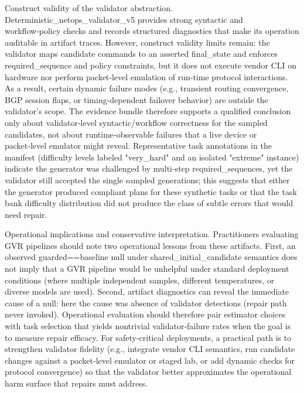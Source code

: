 \documentclass[conference]{IEEEtran}
\begin{document}
Construct validity of the validator abstraction. Deterministic\_netops\_validator\_v5 provides strong syntactic and workflow‑policy checks and records structured diagnostics that make its operation auditable in artifact traces. However, construct validity limits remain: the validator maps candidate commands to an asserted final\_state and enforces required\_sequence and policy constraints, but it does not execute vendor CLI on hardware nor perform packet‑level emulation of run‑time protocol interactions. As a result, certain dynamic failure modes (e.g., transient routing convergence, BGP session flaps, or timing-dependent failover behavior) are outside the validator's scope. The evidence bundle therefore supports a qualified conclusion only about validator‑level syntactic/workflow correctness for the sampled candidates, not about runtime‑observable failures that a live device or packet‑level emulator might reveal. Representative task annotations in the manifest (difficulty levels labeled "very\_hard" and an isolated "extreme" instance) indicate the generator was challenged by multi‑step required\_sequences, yet the validator still accepted the single sampled generations; this suggests that either the generator produced compliant plans for these synthetic tasks or that the task bank difficulty distribution did not produce the class of subtle errors that would need repair.

Operational implications and conservative interpretation. Practitioners evaluating GVR pipelines should note two operational lessons from these artifacts. First, an observed guarded==baseline null under shared\_initial\_candidate semantics does not imply that a GVR pipeline would be unhelpful under standard deployment conditions (where multiple independent samples, different temperatures, or diverse models are used). Second, artifact diagnostics can reveal the immediate cause of a null: here the cause was absence of validator detections (repair path never invoked). Operational evaluation should therefore pair estimator choices with task selection that yields nontrivial validator‑failure rates when the goal is to measure repair efficacy. For safety‑critical deployments, a practical path is to strengthen validator fidelity (e.g., integrate vendor CLI semantics, run candidate changes against a packet‑level emulator or staged lab, or add dynamic checks for protocol convergence) so that the validator better approximates the operational harm surface that repairs must address.
\end{document}
